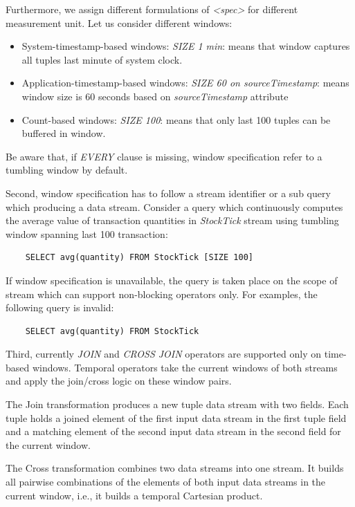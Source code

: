 Furthermore, we assign different formulations of \textit{<spec>} for different measurement unit. Let us consider different windows:
\begin{itemize}
	\item System-timestamp-based windows: \textit{SIZE 1 min}: means that window captures all tuples last minute of system clock.
	\item Application-timestamp-based windows: \textit{SIZE 60 on sourceTimestamp}: means window size is 60 seconds based on \textit{sourceTimestamp} attribute
	\item Count-based windows: \textit{SIZE 100}: means that only last 100 tuples can be buffered in window.
\end{itemize}
Be aware that, if \textit{EVERY} clause is missing, window specification refer to a tumbling window by default.


Second, window specification has to follow a stream identifier or a sub query which producing a data stream. Consider a query which continuously computes the average value of transaction quantities in \textit{StockTick} stream using tumbling window spanning last 100 transaction:

\begin{verbatim}
	SELECT avg(quantity) FROM StockTick [SIZE 100]
\end{verbatim}

If window specification is unavailable, the query is taken place on the scope of stream which can support non-blocking operators only. For examples, the following query is invalid:
\begin{lstlisting}
	SELECT avg(quantity) FROM StockTick
\end{lstlisting}

Third, currently \textit{JOIN} and \textit{CROSS JOIN} operators are supported only on time-based windows. Temporal operators take the current windows of both streams and apply the join/cross logic on these window pairs.

The Join transformation produces a new tuple data stream with two fields. Each tuple holds a joined element of the first input data stream in the first tuple field and a matching element of the second input data stream in the second field for the current window.

The Cross transformation combines two data streams into one stream. It builds all pairwise combinations of the elements of both input data streams in the current window, i.e., it builds a temporal Cartesian product.


